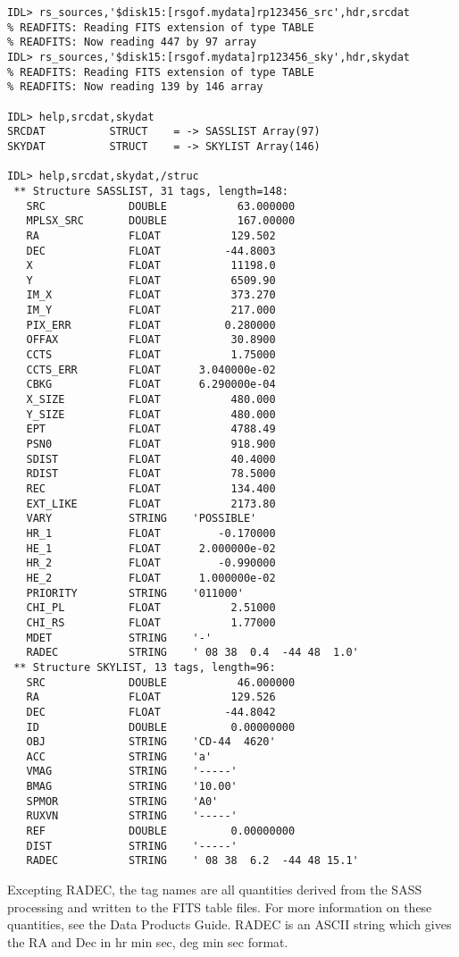 \medskip\noindent
\begin{verbatim}
IDL> rs_sources,'$disk15:[rsgof.mydata]rp123456_src',hdr,srcdat
% READFITS: Reading FITS extension of type TABLE
% READFITS: Now reading 447 by 97 array
IDL> rs_sources,'$disk15:[rsgof.mydata]rp123456_sky',hdr,skydat
% READFITS: Reading FITS extension of type TABLE
% READFITS: Now reading 139 by 146 array
 
IDL> help,srcdat,skydat
SRCDAT          STRUCT    = -> SASSLIST Array(97)
SKYDAT          STRUCT    = -> SKYLIST Array(146)
 
IDL> help,srcdat,skydat,/struc
 ** Structure SASSLIST, 31 tags, length=148:
   SRC             DOUBLE           63.000000
   MPLSX_SRC       DOUBLE           167.00000
   RA              FLOAT           129.502
   DEC             FLOAT          -44.8003
   X               FLOAT           11198.0
   Y               FLOAT           6509.90
   IM_X            FLOAT           373.270
   IM_Y            FLOAT           217.000
   PIX_ERR         FLOAT          0.280000
   OFFAX           FLOAT           30.8900
   CCTS            FLOAT           1.75000
   CCTS_ERR        FLOAT      3.040000e-02
   CBKG            FLOAT      6.290000e-04
   X_SIZE          FLOAT           480.000
   Y_SIZE          FLOAT           480.000
   EPT             FLOAT           4788.49
   PSN0            FLOAT           918.900
   SDIST           FLOAT           40.4000
   RDIST           FLOAT           78.5000
   REC             FLOAT           134.400
   EXT_LIKE        FLOAT           2173.80
   VARY            STRING    'POSSIBLE'
   HR_1            FLOAT         -0.170000
   HE_1            FLOAT      2.000000e-02
   HR_2            FLOAT         -0.990000
   HE_2            FLOAT      1.000000e-02
   PRIORITY        STRING    '011000'
   CHI_PL          FLOAT           2.51000
   CHI_RS          FLOAT           1.77000
   MDET            STRING    '-'
   RADEC           STRING    ' 08 38  0.4  -44 48  1.0'
 ** Structure SKYLIST, 13 tags, length=96:
   SRC             DOUBLE           46.000000
   RA              FLOAT           129.526
   DEC             FLOAT          -44.8042
   ID              DOUBLE          0.00000000
   OBJ             STRING    'CD-44  4620'
   ACC             STRING    'a'
   VMAG            STRING    '-----'
   BMAG            STRING    '10.00'
   SPMOR           STRING    'A0'
   RUXVN           STRING    '-----'
   REF             DOUBLE          0.00000000
   DIST            STRING    '-----'
   RADEC           STRING    ' 08 38  6.2  -44 48 15.1'
\end{verbatim}
Excepting RADEC, the tag names are all quantities derived from the SASS
processing and written to the FITS table files. For more information on these
quantities, see the Data Products Guide. RADEC is an ASCII string which gives
the RA and Dec in hr min sec, deg min sec format.
 
